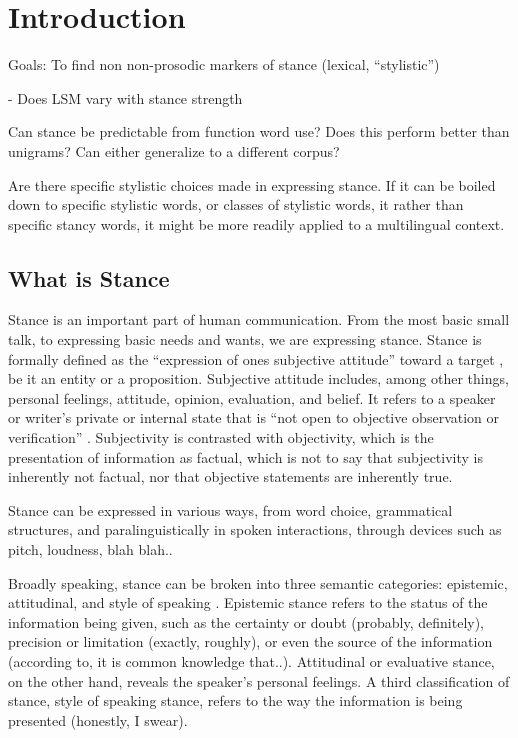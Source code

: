 \section{Introduction}

Goals:  To find non non-prosodic markers of stance (lexical, ``stylistic'') 

- Does LSM vary with stance strength 

Can stance be predictable from function word use?  
Does this perform better than unigrams?  
Can either generalize to a different corpus?  



Are there specific stylistic choices made in expressing stance.  If it can be boiled down to specific stylistic words, or classes of stylistic words, it rather than specific stancy words, it might be more readily applied to a multilingual context.

\subsection{What is Stance}

Stance is an important part of human communication.  From the most basic small talk, to expressing basic needs and wants, we are expressing stance.   Stance is formally defined as the ``expression of ones subjective attitude'' toward a target \citep{haddington2004stance}, be it an entity or a proposition.  Subjective attitude includes, among other things, personal feelings, attitude, opinion, evaluation, and belief.  It refers to a speaker or writer's private or internal state that is ``not open to objective observation or verification'' \citep{wiebe2006word, wiebe2004learning}.  Subjectivity is contrasted with objectivity, which is the presentation of information as factual, which is not to say that subjectivity is inherently not factual, nor that objective statements are inherently true.  

Stance can be expressed in various ways, from word choice, grammatical structures, and paralinguistically in spoken interactions, through devices such as pitch, loudness, blah blah.. 

Broadly speaking, stance can be broken into three semantic categories: epistemic, attitudinal, and style of speaking \citep{biber1999grammar}.  Epistemic stance refers to the status of the information being given, such as the certainty or doubt (probably, definitely), precision or limitation (exactly, roughly), or even the source of the information (according to, it is common knowledge that..).  Attitudinal or evaluative stance, on the other hand, reveals the speaker's personal feelings.  A third classification of stance, style of speaking stance, refers to the way the information is being presented (honestly, I swear).  

